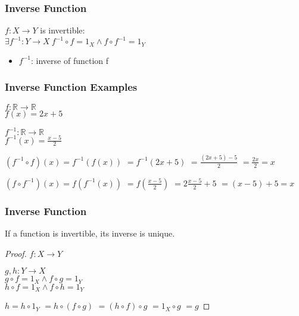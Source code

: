 \documentclass[dvipsnames]{beamer}
\begin{document}
\begin{frame}
  \frametitle{Inverse Function}

  \begin{definition}
    $f: X \rightarrow Y$ is \alert{invertible}:\\
      $\exists f^{-1}: Y \rightarrow X~f^{-1} \circ f = 1_X \wedge f \circ f^{-1} = 1_Y$

    \begin{itemize}
      \item $f^{-1}$: \alert{inverse} of function f
    \end{itemize}
  \end{definition}
\end{frame}

\begin{frame}
  \frametitle{Inverse Function Examples}

  \begin{example}
    $f: \mathbb{R} \rightarrow \mathbb{R}$\\
    $f(x) = 2x + 5$

    \pause
    \bigskip
    $f^{-1}: \mathbb{R} \rightarrow \mathbb{R}$\\
    $f^{-1}(x) = \frac{x - 5}{2}$

    \pause
    \bigskip
    $(f^{-1} \circ f)(x) = f^{-1}(f(x))$
    \pause
    $ = f^{-1}(2x + 5)$
    \pause
    $ = \frac{(2x + 5) - 5}{2}$
    \pause
    $ = \frac{2x}{2} = x$
    \medskip

    \pause
    $(f \circ f^{-1})(x) = f(f^{-1}(x))$
    \pause
    $ = f(\frac{x - 5}{2})$
    \pause
    $ = 2 \frac{x - 5}{2} + 5$
    \pause
    $ = (x - 5) + 5 = x$
  \end{example}
\end{frame}

\begin{frame}
  \frametitle{Inverse Function}

  \begin{theorem}
    If a function is invertible, its inverse is unique.
  \end{theorem}

  \pause
  \begin{proof}
    $f: X \rightarrow Y$

    \pause
    \medskip
    $g,h: Y \rightarrow X$\\
    $g \circ f = 1_X \wedge f \circ g = 1_Y$\\
    $h \circ f = 1_X \wedge f \circ h = 1_Y$

    \pause
    \medskip
    $h = h \circ 1_Y$
    \pause
    $ = h \circ (f \circ g)$
    \pause
    $ = (h \circ f) \circ g$
    \pause
    $ = 1_X \circ g$
    \pause
    $ = g$
  \end{proof}
\end{frame}
\end{document}
